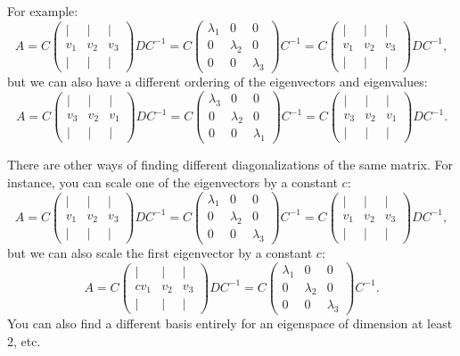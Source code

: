 \documentclass[a4paper,12pt]{article}
\begin{document}
For example:
\[
A = C \begin{pmatrix} | & | & | \\ v_1 & v_2 & v_3 \\ | & | & | \end{pmatrix} D C^{-1}
= C \begin{pmatrix} \lambda_1 & 0 & 0 \\ 0 & \lambda_2 & 0 \\ 0 & 0 & \lambda_3 \end{pmatrix} C^{-1}
= C \begin{pmatrix} | & | & | \\ v_1 & v_2 & v_3 \\ | & | & | \end{pmatrix} D C^{-1},
\]
but we can also have a different ordering of the eigenvectors and eigenvalues:
\[
A = C \begin{pmatrix} | & | & | \\ v_3 & v_2 & v_1 \\ | & | & | \end{pmatrix} D C^{-1}
= C \begin{pmatrix} \lambda_3 & 0 & 0 \\ 0 & \lambda_2 & 0 \\ 0 & 0 & \lambda_1 \end{pmatrix} C^{-1}
= C \begin{pmatrix} | & | & | \\ v_3 & v_2 & v_1 \\ | & | & | \end{pmatrix} D C^{-1}.
\]

There are other ways of finding different diagonalizations of the same matrix. For instance, you can scale one of the eigenvectors by a constant \(c\):
\[
A = C \begin{pmatrix} | & | & | \\ v_1 & v_2 & v_3 \\ | & | & | \end{pmatrix} D C^{-1}
= C \begin{pmatrix} \lambda_1 & 0 & 0 \\ 0 & \lambda_2 & 0 \\ 0 & 0 & \lambda_3 \end{pmatrix} C^{-1}
= C \begin{pmatrix} | & | & | \\ v_1 & v_2 & v_3 \\ | & | & | \end{pmatrix} D C^{-1},
\]
but we can also scale the first eigenvector by a constant \(c\):
\[
A = C \begin{pmatrix} | & | & | \\ c v_1 & v_2 & v_3 \\ | & | & | \end{pmatrix} D C^{-1}
= C \begin{pmatrix} \lambda_1 & 0 & 0 \\ 0 & \lambda_2 & 0 \\ 0 & 0 & \lambda_3 \end{pmatrix} C^{-1}.
\]
You can also find a different basis entirely for an eigenspace of dimension at least 2, etc.
\end{document}
